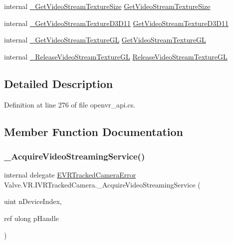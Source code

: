 \begin{DoxyCompactItemize}
\item 
internal \mbox{\hyperlink{struct_valve_1_1_v_r_1_1_i_v_r_tracked_camera_a8a269f673569d9678c1389d30b523de4}{\+\_\+\+Get\+Video\+Stream\+Texture\+Size}} \mbox{\hyperlink{struct_valve_1_1_v_r_1_1_i_v_r_tracked_camera_a3d135c2d709a3ed237d87acdd8e2ba1f}{Get\+Video\+Stream\+Texture\+Size}}
\item 
internal \mbox{\hyperlink{struct_valve_1_1_v_r_1_1_i_v_r_tracked_camera_a3b47cba3117a77b9f31e6e58ceb9936e}{\+\_\+\+Get\+Video\+Stream\+Texture\+D3\+D11}} \mbox{\hyperlink{struct_valve_1_1_v_r_1_1_i_v_r_tracked_camera_a2435f26e8df592e32d4e79307c13d27e}{Get\+Video\+Stream\+Texture\+D3\+D11}}
\item 
internal \mbox{\hyperlink{struct_valve_1_1_v_r_1_1_i_v_r_tracked_camera_afb798bb54c37360e64429e07763b6cff}{\+\_\+\+Get\+Video\+Stream\+Texture\+GL}} \mbox{\hyperlink{struct_valve_1_1_v_r_1_1_i_v_r_tracked_camera_a168726229b84537717a39c982b31f4dd}{Get\+Video\+Stream\+Texture\+GL}}
\item 
internal \mbox{\hyperlink{struct_valve_1_1_v_r_1_1_i_v_r_tracked_camera_aabf5efcf29016561cc7b4108916f3632}{\+\_\+\+Release\+Video\+Stream\+Texture\+GL}} \mbox{\hyperlink{struct_valve_1_1_v_r_1_1_i_v_r_tracked_camera_a7cce6c8bf2795612ec4a888f5210a7e8}{Release\+Video\+Stream\+Texture\+GL}}
\end{DoxyCompactItemize}


\subsection{Detailed Description}


Definition at line 276 of file openvr\+\_\+api.\+cs.



\subsection{Member Function Documentation}
\mbox{\label{struct_valve_1_1_v_r_1_1_i_v_r_tracked_camera_ac535815424bd4d396ab6ddc1e92065e5}} 
\subsubsection{\texorpdfstring{\_AcquireVideoStreamingService()}{\_AcquireVideoStreamingService()}}
{\footnotesize\ttfamily internal delegate \mbox{\hyperlink{namespace_valve_1_1_v_r_ad0e012e846f5d93848783c044614cfd3}{E\+V\+R\+Tracked\+Camera\+Error}} Valve.\+V\+R.\+I\+V\+R\+Tracked\+Camera.\+\_\+\+Acquire\+Video\+Streaming\+Service (\begin{DoxyParamCaption}\item[{uint}]{n\+Device\+Index,  }\item[{ref ulong}]{p\+Handle }\end{DoxyParamCaption})}

